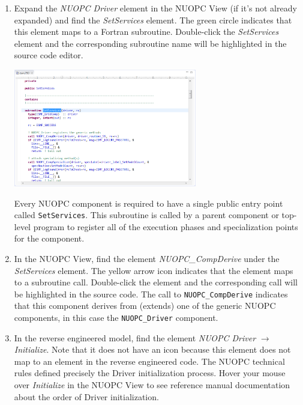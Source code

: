 \documentclass[oneside,11pt]{memoir}
\begin{document}
\begin{enumerate}
\item Expand the \emph{NUOPC Driver} element in the NUOPC View (if it's not already expanded) and find the \emph{SetServices} element. The green circle indicates that this element maps to a Fortran subroutine.  Double-click the \emph{SetServices} element and the corresponding subroutine name will be highlighted in the source code editor.

\vspace{24pt}
\parbox{\linewidth}{\centering
  \includegraphics[width=8cm]{figs/reveng_fig4.png}
}
\vspace{24pt}

Every NUOPC component is required to have a single public entry point called \texttt{SetServices}.  This subroutine is called by a parent component or top-level program to register all of the execution phases and specialization points for the component.

\item In the NUOPC View, find the element \emph{NUOPC\_CompDerive} under the \emph{SetServices} element. The yellow arrow icon indicates that the element maps to a subroutine call. Double-click the element and the corresponding call will be highlighted in the source code. The call to \texttt{NUOPC\_CompDerive} indicates that this component derives from (extends) one of the generic NUOPC components, in this case the \texttt{NUOPC\_Driver} component. 

\item In the reverse engineered model, find the element \emph{NUOPC Driver} $\rightarrow$ \emph{Initialize}. Note that it does not have an icon because this element does not map to an element in the reverse engineered code. The NUOPC technical rules defined precisely the Driver initialization process. Hover your mouse over \emph{Initialize} in the NUOPC View to see reference manual documentation about the order of Driver initialization.


\end{enumerate}
\end{document}
